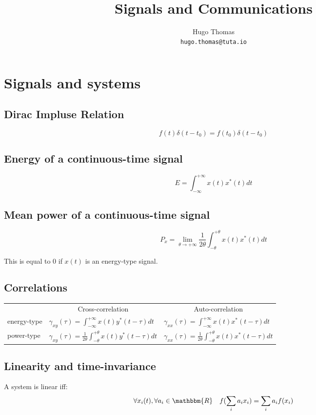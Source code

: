 \documentclass{article}
\author{Hugo Thomas \\ \texttt{hugo.thomas@tuta.io}}
\title{Signals and Communications}
\begin{document}
\maketitle
\tableofcontents
\newpage
\section{Signals and systems}
\subsection*{Dirac Impluse Relation}
$$
    f(t)\delta(t-t_0)=f(t_0)\delta(t-t_0)
$$

\subsection*{Energy of a continuous-time signal}
$$
E = \int_{-\infty}^{+\infty}x(t)x^*(t)dt
$$

\subsection*{Mean power of a continuous-time signal}
$$
P_x = \lim_{\theta \to +\infty} \frac{1}{2\theta}
\int_{-\theta}^{+\theta}x(t)x^*(t)dt
$$

\begin{center}
This is equal to $0$ if $x(t)$ is an energy-type signal.
\end{center}


\subsection*{Correlations}
\begin{table}[h]
\begin{tabular}{lll}
& \multicolumn{1}{c}{Cross-correlation} & \multicolumn{1}{c}{Auto-correlation} \\
energy-type & $\gamma_{xy}(\tau) = \int_{-\infty}^{+\infty}x(t)y^*(t-\tau)dt$ & $\gamma_{xx}(\tau) = \int_{-\infty}^{+\infty}x(t)x^*(t-\tau)dt$ \\
power-type & $\gamma_{xy}(\tau) = \frac{1}{2\theta}\int_{-\theta}^{+\theta}x(t)y^*(t-\tau)dt$ & $\gamma_{xx}(\tau) = \frac{1}{2\theta}\int_{-\theta}^{+\theta}x(t)x^*(t-\tau)dt $
\end{tabular}
\end{table}

\subsection*{Linearity and time-invariance}
A system is linear iff:
$$
    \forall x_i(t), \forall a_i \in \mathbbm{R} \quad f(\sum_i a_ix_i) = \sum_ia_if(x_i)
$$
\end{document}
